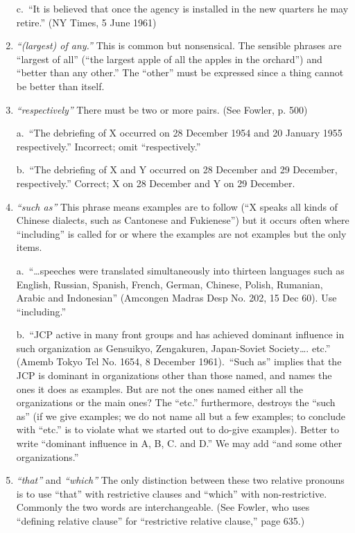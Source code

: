 \documentclass[
    oneside,
    11pt,
]{memoir}
\begin{document}
\begin{enumerate}
  c.\ \enquote{It is believed that once the agency is installed in the new quarters he may retire.} (NY Times, 5 June 1961) 
  
  \item \emph{\enquote{(largest) of any.}} This is common but nonsensical. The sensible phrases are \enquote{largest of all} (\enquote{the largest apple of all the apples in the orchard}) and \enquote{better than any other.} The \enquote{other} must be expressed since a thing cannot be better than itself. 
  
  \item \emph{\enquote{respectively}} There must be two or more pairs. (See Fowler, p. 500)
  
  a.\ \enquote{The debriefing of X occurred on 28 December 1954 and 20 January 1955 respectively.} Incorrect; omit \enquote{respectively.} 
  
  b.\ \enquote{The debriefing of X and Y occurred on 28 December and 29 December, respectively.} Correct; X on 28 December and Y on 29 December. 
  
  \item \emph{\enquote{such as}} This phrase means examples are to follow (\enquote{X speaks all kinds of Chinese dialects, such as Cantonese and Fukienese}) but it occurs often where \enquote{including} is called for or where the examples are not examples but the only items. 
  
  a.\ \enquote{\dots speeches were translated simultaneously into thirteen languages such as English, Russian, Spanish, French, German, Chinese, Polish, Rumanian, Arabic and Indonesian} (Amcongen Madras Desp No. 202, 15 Dec 60). Use \enquote{including.}
  
  b.\ \enquote{JCP active in many front groups and has achieved dominant influence in such organization as Gensuikyo, Zengakuren, Japan-Soviet Society\dots. etc.} (Amemb Tokyo Tel No. 1654, 8 December 1961).\ \enquote{Such as} implies that the JCP is dominant in organizations other than those named, and names the ones it does as examples. But are not the ones named either all the organizations or the main ones? The \enquote{etc.} furthermore, destroys the \enquote{such as} (if we give examples; we do not name all but a few examples; to conclude with \enquote{etc.} is to violate what we started out to do-give examples). Better to write \enquote{dominant influence in A, B, C. and D.} We may add \enquote{and some other organizations.}
  
  \item \emph{\enquote{that}} and \emph{\enquote{which}} The only distinction between these two relative pronouns is to use \enquote{that} with restrictive clauses and \enquote{which} with non-restrictive. Commonly the two words are interchangeable. (See Fowler, who uses \enquote{defining relative clause} for \enquote{restrictive relative clause,} page 635.) 
  

\end{enumerate}
\end{document}
